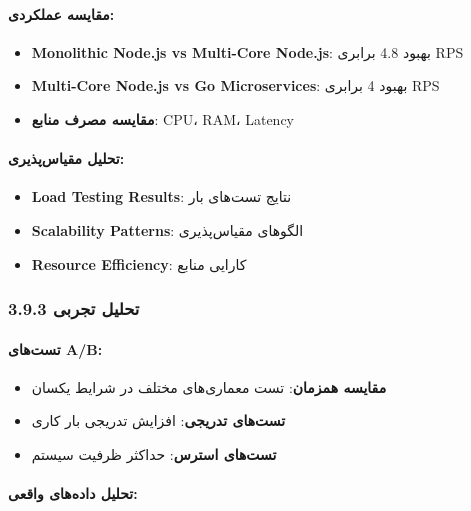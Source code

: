 \documentclass[
]{article}
\providecommand{\tightlist}{%
  \setlength{\itemsep}{0pt}\setlength{\parskip}{0pt}}
\begin{document}
\paragraph{مقایسه
عملکردی:}\label{ux645ux642ux627ux6ccux633ux647-ux639ux645ux644ux6a9ux631ux62fux6cc-1}

\begin{itemize}
\tightlist
\item
  \textbf{Monolithic Node.js vs Multi-Core Node.js}: بهبود 4.8 برابری
  RPS
\item
  \textbf{Multi-Core Node.js vs Go Microservices}: بهبود 4 برابری RPS
\item
  \textbf{مقایسه مصرف منابع}: CPU، RAM، Latency
\end{itemize}

\paragraph{تحلیل
مقیاس‌پذیری:}\label{ux62aux62dux644ux6ccux644-ux645ux642ux6ccux627ux633ux67eux630ux6ccux631ux6cc}

\begin{itemize}
\tightlist
\item
  \textbf{Load Testing Results}: نتایج تست‌های بار
\item
  \textbf{Scalability Patterns}: الگوهای مقیاس‌پذیری
\item
  \textbf{Resource Efficiency}: کارایی منابع
\end{itemize}

\subsubsection{3.9.3 تحلیل
تجربی}\label{ux62aux62dux644ux6ccux644-ux62aux62cux631ux628ux6cc}

\paragraph{تست‌های A/B:}\label{ux62aux633ux62aux647ux627ux6cc-ab}

\begin{itemize}
\tightlist
\item
  \textbf{مقایسه همزمان}: تست معماری‌های مختلف در شرایط یکسان
\item
  \textbf{تست‌های تدریجی}: افزایش تدریجی بار کاری
\item
  \textbf{تست‌های استرس}: حداکثر ظرفیت سیستم
\end{itemize}

\paragraph{تحلیل داده‌های
واقعی:}\label{ux62aux62dux644ux6ccux644-ux62fux627ux62fux647ux647ux627ux6cc-ux648ux627ux642ux639ux6cc}
\end{document}
